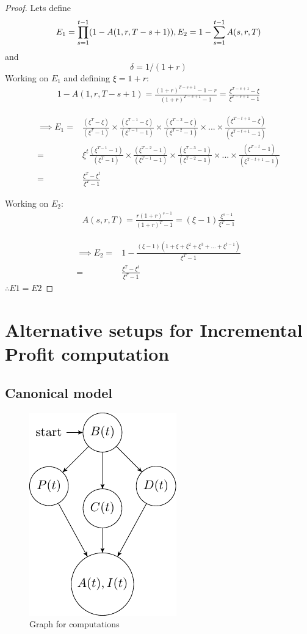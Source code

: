 \begin{proof}{}{} Lets define
\[
E_1=\prod^{t-1}_{s=1}(1-A(1,r,T-s+1)), \\
E_2 =1-\sum^{t-1}_{s=1}A(s,r,T)
\]
and
\[
\delta =1/(1+r)
\]
Working on $E_1$ and defining $\xi=1+r$:
\begin{align}
1-A(1,r,T-s+1) = \frac{(1+r)^{T-s+1}-1-r}{(1+r)^{T-s+1}-1}=\frac{\xi^{T-s+1}-\xi}{\xi^{T-s+1}-1} \nonumber
\end{align}

\begin{align}
\implies E_1 =& \frac{(\xi^T-\xi)}{(\xi^T-1)}\times \frac{(\xi^{T-1}-\xi)}{(\xi^{T-1}-1)} \times \frac{(\xi^{T-2}-\xi)}{(\xi^{T-2}-1)} \times ... \times \frac{(\xi^{T-t+1}-\xi)}{(\xi^{T-t+1}-1)} \nonumber\\
=&\xi^t \frac{(\xi^{T-1}-1)}{(\xi^T-1)}\times \frac{(\xi^{T-2}-1)}{(\xi^{T-1}-1)} \times \frac{(\xi^{T-3}-1)}{(\xi^{T-2}-1)} \times ... \times \frac{(\xi^{T-t}-1)}{(\xi^{T-t+1}-1)} \nonumber\\
=&\frac{\xi^T-\xi^t}{\xi^T-1} \label{eq:e1}
\end{align}

Working on $E_2$:
\begin{align}
A(s,r,T) = \frac{r(1+r)^{s-1}}{(1+r)^{T}-1}=(\xi-1)\frac{\xi^{s-1}}{\xi^{T}-1} \nonumber
\end{align}

\begin{align}
\implies E_2 =& 1-\frac{(\xi-1)(1+\xi+\xi^2+\xi^3+...+\xi^{t-1})}{\xi^T-1}\nonumber\\
=&\frac{\xi^T-\xi^t}{\xi^T-1} 
\end{align}
$\therefore E1=E2$
\end{proof}

\section{Alternative setups for Incremental Profit computation}



\subsection{Canonical model \label{can}} 
\begin{figure}[H]
  \centering
      \includegraphics[width=.3\textwidth]{Graph2.pdf} 
 \caption{Graph for computations}
 \label{fig:graph2}
\end{figure}

